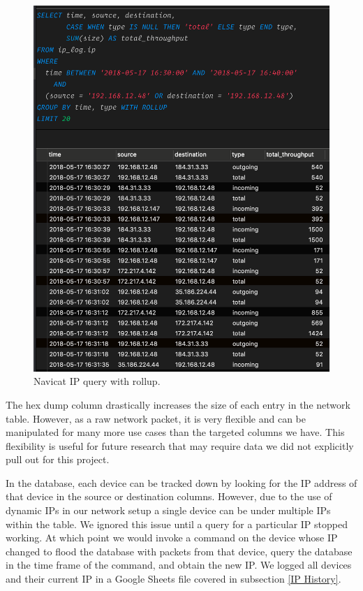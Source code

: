 \begin{figure}[H]
    \centering
    \includegraphics[width=1\textwidth]{figures/navicatRollup.png}
    \caption{Navicat IP query with rollup.}
    \label{fig:navicatRollup}
\end{figure}

The hex dump column drastically increases the size of each entry in the network table. However, as a raw network packet, it is very flexible and can be manipulated for many more use cases than the targeted columns we have. This flexibility is useful for future research that may require data we did not explicitly pull out for this project.

In the database, each device can be tracked down by looking for the IP address of that device in the source or destination columns. However, due to the use of dynamic IPs in our network setup a single device can be under multiple IPs within the table. We ignored this issue until a query for a particular IP stopped working. At which point we would invoke a command on the device whose IP changed to flood the database with packets from that device, query the database in the time frame of the command, and obtain the new IP. We logged all devices and their current IP in a Google Sheets \cite{googleSheets} file covered in subsection \ref{IP History}.

